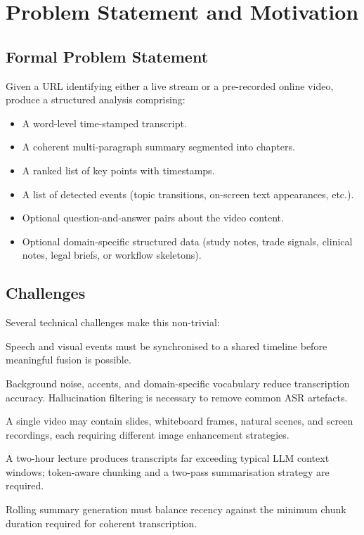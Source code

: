 \documentclass[12pt,a4paper]{article}
\begin{document}
\section{Problem Statement and Motivation}
\label{sec:problem}

\subsection{Formal Problem Statement}

Given a URL identifying either a live stream or a pre-recorded online video, produce a
structured analysis comprising:
\begin{itemize}[leftmargin=*]
  \item A word-level time-stamped transcript.
  \item A coherent multi-paragraph summary segmented into chapters.
  \item A ranked list of key points with timestamps.
  \item A list of detected events (topic transitions, on-screen text appearances, etc.).
  \item Optional question-and-answer pairs about the video content.
  \item Optional domain-specific structured data (study notes, trade signals, clinical
        notes, legal briefs, or workflow skeletons).
\end{itemize}

\subsection{Challenges}

Several technical challenges make this non-trivial:

\begin{description}[leftmargin=1.5cm]
  \item[Multimodal alignment.] Speech and visual events must be synchronised to a shared
    timeline before meaningful fusion is possible.
  \item[ASR accuracy.] Background noise, accents, and domain-specific vocabulary reduce
    transcription accuracy. Hallucination filtering is necessary to remove common ASR
    artefacts.
  \item[Visual quality variation.] A single video may contain slides, whiteboard frames,
    natural scenes, and screen recordings, each requiring different image enhancement
    strategies.
  \item[LLM context limits.] A two-hour lecture produces transcripts far exceeding typical
    LLM context windows; token-aware chunking and a two-pass summarisation strategy
    are required.
  \item[Live latency.] Rolling summary generation must balance recency against the
    minimum chunk duration required for coherent transcription.
\end{description}
\end{document}
